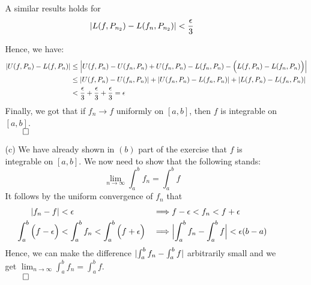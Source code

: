 \documentclass[11pt]{article}
\DeclarePairedDelimiter\abs{\lvert}{\rvert}%
\DeclarePairedDelimiter\absb{\Big\lvert}{\Big\rvert}%
\begin{document}
\begin{itemize}
\begin{itemize}
                A similar results holds for
                \begin{equation*}
                  \abs{L(f, P_{n_2}) - L(f_n, P_{n_2})}  < \frac{\epsilon}{3}
                \end{equation*}

                Hence, we have:
                \begin{align*}
                  \abs{U(f, P_n) - L(f, P_n)} &\leq 
                  \absb{U(f, P_n) - U(f_n, P_n) + U(f_n, P_n) - L(f_n, P_n) -
                      \Big(L(f, P_n) - L(f_n, P_n)\Big)}\\
                  &\leq \abs{ U(f, P_n) - U(f_n, P_n) } + \abs{ U(f_n, P_n) -
                      L(f_n, P_n) } + \abs{ L(f, P_n) - L(f_n, P_n) }\\
                  &< \frac{\epsilon}{3} + \frac{\epsilon}{3} +
                     \frac{\epsilon}{3} = \epsilon
                \end{align*}
                Finally, we got that if $f_n \to f$ uniformly on $[a, b]$, then
                $f$ is integrable on $[a, b]$.\\
                $\qed$

            \item[(c)]
                We have already shown in $(b)$ part of the exercise that $f$ is
                integrable on $[a, b]$. We now need to show that the following
                stands:
                \begin{equation*}
                  \lim_{n\to \infty} \int_a^b f_n = \int_a^b f
                \end{equation*}
                It follows by the uniform convergence of $f_n$ that
                \begin{align}
                    \abs{f_n - f} &< \epsilon &\implies& f - \epsilon < f_n <
                    f + \epsilon\\
                    \int_a^b \Big(f - \epsilon\Big) &< \int_a^b f_n < \int_a^b
                    \Big(f + \epsilon\Big) &\implies& \absb{\int_a^b f_n -
                    \int_a^b f} < \epsilon(b - a)
                \end{align}
                Hence, we can make the difference $\abs{\int_a^b f_n - \int_a^b
                f}$ arbitrarily small and we get $\lim_{n\to \infty} \int_a^b
                f_n = \int_a^b f$.\\
                $\qed$
        \end{itemize}


\end{itemize}
\end{document}
